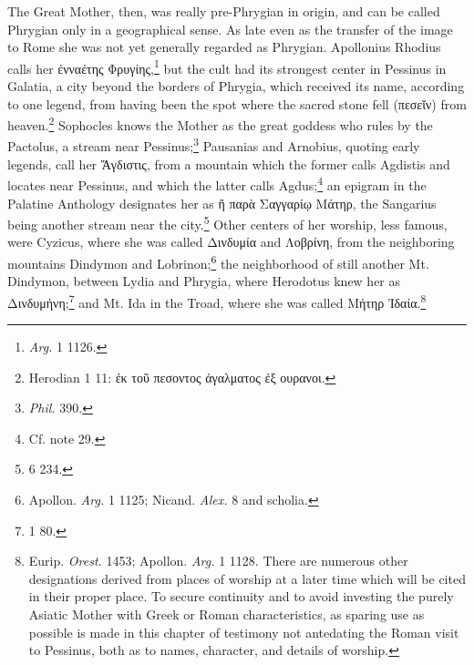 \documentclass[a4paper, 11pt, oneside, polutonikogreek, french]{article}
\begin{document}
The Great Mother, then, was really pre-Phrygian in origin, and can be called Phrygian only in a geographical sense. As late even as the transfer of the image to Rome she was not yet generally regarded as Phrygian. Apollonius Rhodius calls her ἐνναέτης Φρυγίης,\footnote{\emph{Arg.} 1 1126.} but the cult had its strongest center in Pessinus in Galatia, a city beyond the borders of Phrygia, which received its name, according to one legend, from having been the spot where the sacred stone fell (πεσεῐν) from heaven.\footnote{Herodian 1 11: ἐκ τοῦ πεσοντος ἀγαλματος ἐξ ουρανοι.} Sophocles knows the Mother as the great goddess who rules by the Pactolus, a stream near Pessinus;\footnote{\emph{Phil.} 390.} Pausanias and Arnobius, quoting early legends, call her Ἄγδιστις, from a mountain which the former calls Agdistis and locates near Pessinus, and which the latter calls Agdus;\footnote{Cf. note 29.} an epigram in the Palatine Anthology designates her as ἢ παρὰ Σαγγαρίῳ Μάτηρ, the Sangarius being another stream near the city.\footnote{6 234.} Other centers of her worship, less famous, were Cyzicus, where she was called Δινδυμία and Λοβρίνη, from the neighboring mountains Dindymon and Lobrinon;\footnote{Apollon. \emph{Arg.} 1 1125; Nicand. \emph{Alex.} 8 and scholia.} the neighborhood of still another Mt. Dindymon, between Lydia and Phrygia, where Herodotus knew her as Δινδυμήνη;\footnote{1 80.} and Mt. Ida in the Troad, where she was called Μήτηρ Ἰδαία.\footnote{Eurip. \emph{Orest.} 1453; Apollon. \emph{Arg.} 1 1128. There are numerous other designations derived from places of worship at a later time which will be cited in their proper place. To secure continuity and to avoid investing the purely Asiatic Mother with Greek or Roman characteristics, as sparing use as possible is made in this chapter of testimony not antedating the Roman visit to Pessinus, both as to names, character, and details of worship.}
\end{document}
